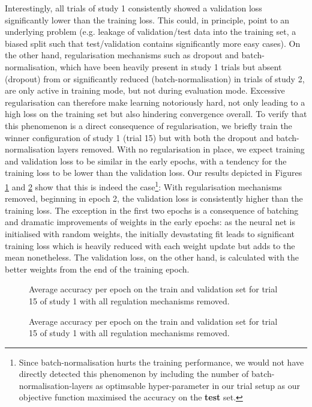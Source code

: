 \documentclass[british,12p]{article}
\begin{document}
   	  	Interestingly, all trials of study 1 consistently showed a validation loss significantly lower than the training loss. This could, in principle, point to an underlying problem (e.g. leakage of validation/test data into the training set, a biased split such that test/validation contains significantly more easy cases). On the other hand, regularisation mechanisms such as dropout and batch-normalisation, which have been heavily present in study 1 trials but absent (dropout) from or significantly reduced (batch-normalisation) in trials of study 2, are only active in training mode, but not during evaluation mode. Excessive regularisation can therefore make learning notoriously hard, not only leading to a high loss on the training set but also hindering convergence overall. To verify that this phenomenon is a direct consequence of regularisation, we briefly train the winner configuration of study 1 (trial 15) but with both the dropout and batch-normalisation layers removed. With no regularisation in place, we expect training and validation loss to be similar in the early epochs, with a tendency for the training loss to be lower than the validation loss. Our results depicted in Figures \ref{fig-trial-1-15-loss-noreg} and \ref{fig-trial-1-15-acc-noreg} show that this is indeed the case\footnote{Since batch-normalisation hurts the training performance, we would not have directly detected this phenomenon by including the number of batch-normalisation-layers as optimsable hyper-parameter in our trial setup as our objective function maximised the accuracy on the \textbf{test} set.}: With regularisation mechanisms removed, beginning in epoch 2, the validation loss is consistently higher than the training loss. The exception in the first two epochs is a consequence of batching and dramatic improvements of weights in the early epochs: as the neural net is initialised with random weights, the initially devastating fit leads to significant training loss which is heavily reduced with each weight update but adds to the mean nonetheless. The validation loss, on the other hand, is calculated with the better weights from the end of the training epoch.   	  	
   	  	
    \begin{figure}[h!]
		\begin{center}
  			\caption{Average accuracy per epoch on the train and validation set for trial 15 of study 1 with all regulation mechanisms removed.}
  			\label{fig-trial-1-15-loss-noreg}
  		\end{center}
	\end{figure}
   	\begin{figure}[h!]
		\begin{center}
  			\caption{Average accuracy per epoch on the train and validation set for trial 15 of study 1 with all regulation mechanisms removed.}
  			\label{fig-trial-1-15-acc-noreg}
  		\end{center}
	\end{figure}
\end{document}
